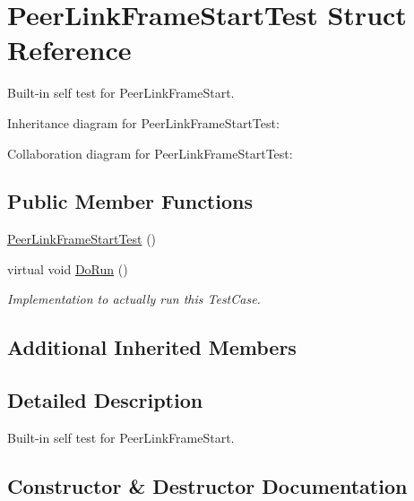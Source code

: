 \hypertarget{structPeerLinkFrameStartTest}{}\section{Peer\+Link\+Frame\+Start\+Test Struct Reference}
\label{structPeerLinkFrameStartTest}


Built-\/in self test for Peer\+Link\+Frame\+Start.  




Inheritance diagram for Peer\+Link\+Frame\+Start\+Test\+:


Collaboration diagram for Peer\+Link\+Frame\+Start\+Test\+:
\subsection*{Public Member Functions}
\begin{DoxyCompactItemize}
\item 
\hyperlink{structPeerLinkFrameStartTest_a1f148f12c113735f421792654d067eb7}{Peer\+Link\+Frame\+Start\+Test} ()
\item 
virtual void \hyperlink{structPeerLinkFrameStartTest_a7a345b46d3b68001328c3724a7317344}{Do\+Run} ()
\begin{DoxyCompactList}\small\item\em Implementation to actually run this Test\+Case. \end{DoxyCompactList}\end{DoxyCompactItemize}
\subsection*{Additional Inherited Members}


\subsection{Detailed Description}
Built-\/in self test for Peer\+Link\+Frame\+Start. 

\subsection{Constructor \& Destructor Documentation}

